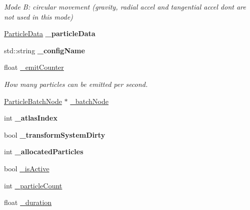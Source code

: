 \begin{DoxyCompactItemize}
\begin{tabbing}
\end{tabbing}\begin{DoxyCompactList}\small\item\em Mode B\+: circular movement (gravity, radial accel and tangential accel don\textquotesingle{}t are not used in this mode) \end{DoxyCompactList}\item 
\mbox{\label{classParticleSystem_a4282a5cd2f048131ab3651fda515bfa9}} 
\hyperlink{classParticleData}{Particle\+Data} {\bfseries \+\_\+particle\+Data}
\item 
\mbox{\label{classParticleSystem_ab1a2b5a57654116d7587f4650abc18df}} 
std\+::string {\bfseries \+\_\+config\+Name}
\item 
\mbox{\label{classParticleSystem_a572b3862c847b47d495b80714836382a}} 
float \hyperlink{classParticleSystem_a572b3862c847b47d495b80714836382a}{\+\_\+emit\+Counter}
\begin{DoxyCompactList}\small\item\em How many particles can be emitted per second. \end{DoxyCompactList}\item 
\hyperlink{classParticleBatchNode}{Particle\+Batch\+Node} $\ast$ \hyperlink{classParticleSystem_ab27a75a8dff1aaaecea870ab1c5d7bca}{\+\_\+batch\+Node}
\item 
\mbox{\label{classParticleSystem_a477a6f48955e1f616a97d94f5a4d6ccd}} 
int {\bfseries \+\_\+atlas\+Index}
\item 
\mbox{\label{classParticleSystem_a3d35bed68d084755fbb94fbcc089dfef}} 
bool {\bfseries \+\_\+transform\+System\+Dirty}
\item 
\mbox{\label{classParticleSystem_a21bacff1863ce075cf85af5672c469aa}} 
int {\bfseries \+\_\+allocated\+Particles}
\item 
bool \hyperlink{classParticleSystem_a30aaa6c20c1b78d0af5cece42cdb959d}{\+\_\+is\+Active}
\item 
int \hyperlink{classParticleSystem_a3999ea956742eda97fdd0762bab4ae07}{\+\_\+particle\+Count}
\item 
float \hyperlink{classParticleSystem_a7946197a6ad6e0d4968275608f954bd3}{\+\_\+duration}

\end{DoxyCompactItemize}
